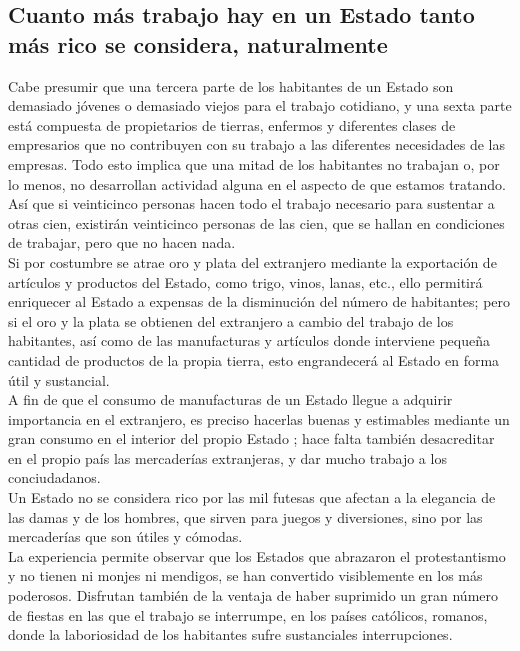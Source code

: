 \documentclass[10pt]{article}
\begin{document}
\begin{multicols}{1}
\section*{Cuanto más trabajo hay en un Estado tanto más rico se considera, naturalmente}
Cabe presumir que una tercera parte de los habitantes de un Estado son demasiado jóvenes o demasiado viejos para el trabajo cotidiano, y una sexta parte está compuesta de propietarios de tierras, enfermos y diferentes clases de empresarios que no contribuyen con su trabajo a las diferentes necesidades de las empresas. Todo esto implica que una mitad de los habitantes no trabajan o, por lo menos, no desarrollan actividad alguna en el aspecto de que estamos tratando. Así que si veinticinco personas hacen todo el trabajo necesario para sustentar a otras cien, existirán veinticinco personas de las cien, que se hallan en condiciones de trabajar, pero que no hacen nada.\\
Si por costumbre se atrae oro y plata del extranjero mediante la exportación de artículos y productos del Estado, como trigo, vinos, lanas, etc., ello permitirá enriquecer al Estado a expensas de la disminución del número de habitantes; pero si el oro y la plata se obtienen del extranjero a cambio del trabajo de los habitantes, así como de las manufacturas y artículos donde interviene pequeña cantidad de productos de la propia tierra, esto engrandecerá al Estado en forma útil y sustancial.\\
A fin de que el consumo de manufacturas de un Estado llegue a adquirir importancia en el extranjero, es preciso hacerlas buenas y estimables mediante un gran consumo en el interior del propio Estado ; hace falta también desacreditar en el propio país las mercaderías extranjeras, y dar mucho trabajo a los conciudadanos.\\
Un Estado no se considera rico por las mil futesas que afectan a la elegancia de las damas y de los hombres, que sirven para juegos y diversiones, sino por las mercaderías que son útiles y cómodas.\\
La experiencia permite observar que los Estados que abrazaron el protestantismo y no tienen ni monjes ni mendigos, se han convertido visiblemente en los más poderosos. Disfrutan también de la ventaja de haber suprimido un gran número de fiestas en las que el trabajo se interrumpe, en los países católicos, romanos, donde la laboriosidad de los habitantes sufre sustanciales interrupciones.

\end{multicols}
\end{document}

